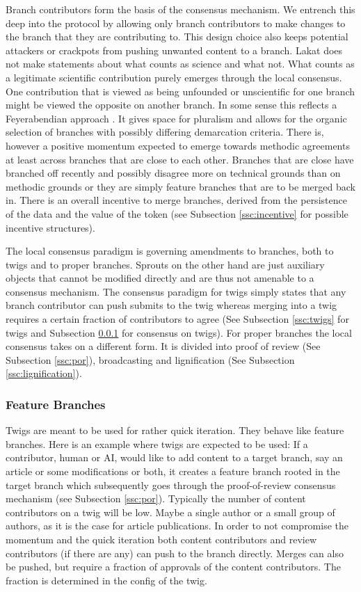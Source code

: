 \documentclass[14pt]{article}
\begin{document}
Branch contributors form the basis of the consensus mechanism. We entrench this deep into the protocol by allowing only branch contributors to make changes to the branch that they are contributing to. This design choice also keeps potential attackers or crackpots from pushing unwanted content to a branch. Lakat does not make statements about what counts as science and what not. What counts as a legitimate scientific contribution purely emerges through the local consensus. One contribution that is viewed as being unfounded or unscientific for one branch might be viewed the opposite on another branch. In some sense this reflects a Feyerabendian approach \cite{}. It gives space for pluralism and allows for the organic selection of branches with possibly differing demarcation criteria. There is, however a positive momentum expected to emerge towards methodic agreements at least across branches that are close to each other. Branches that are close have branched off recently and possibly disagree more on technical grounds than on methodic grounds or they are simply feature branches that are to be merged back in. There is an overall incentive to merge branches, derived from the persistence of the data and the value of the token (see Subsection \ref{ssc:incentive} for possible incentive structures). 

The local consensus paradigm is governing amendments to branches, both to twigs and to proper branches. Sprouts on the other hand are just auxiliary objects that cannot be modified directly and are thus not amenable to a consensus mechanism. The consensus paradigm for twigs simply states that any branch contributor can push submits to the twig whereas merging into a twig requires a certain fraction of contributors to agree (See Subsection \ref{ssc:twigs} for twigs and Subsection \ref{ssc:twiglocalconsensus} for consensus on twigs). For proper branches the local consensus takes on a different form. It is divided into proof of review (See Subsection \ref{ssc:por}), broadcasting and lignification (See Subsection \ref{ssc:lignification}).

\subsubsection{Feature Branches}\label{ssc:twiglocalconsensus}

Twigs are meant to be used for rather quick iteration. They behave like feature branches. Here is an example where twigs are expected to be used: If a contributor, human or AI, would like to add content to a target branch, say an article or some modifications or both, it creates a feature branch rooted in the target branch which subsequently goes through the proof-of-review consensus mechanism (see Subsection \ref{ssc:por}). Typically the number of content contributors on a twig will be low. Maybe a single author or a small group of authors, as it is the case for article publications. In order to not compromise the momentum and the quick iteration both content contributors and review contributors (if there are any) can push to the branch directly. Merges can also be pushed, but require a fraction of approvals of the content contributors. The fraction is determined in the config of the twig. 
\end{document}
